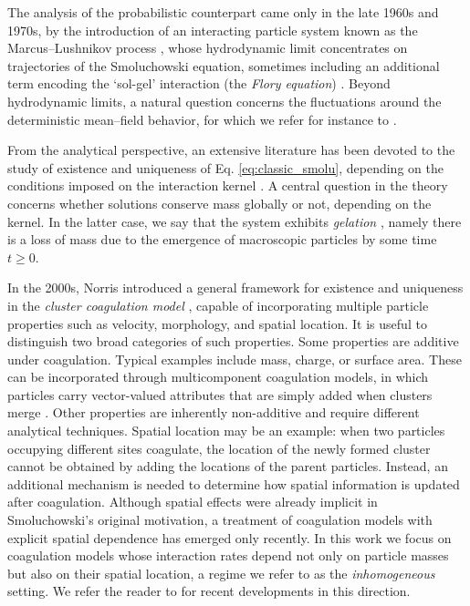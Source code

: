 \documentclass[12pt,twoside]{article}
\begin{document}
The analysis of the probabilistic counterpart came only in the late 1960s and 1970s, by the introduction of an interacting particle system known as the Marcus--Lushnikov process \cite{Lushnikov78,Marcus68,aldous99}, whose hydrodynamic limit concentrates on trajectories of the Smoluchowski equation, sometimes including an additional term encoding the `sol-gel' interaction (the \emph{Flory equation}) \cite{fournier-laurencot-09,fournier-giet-04}. Beyond hydrodynamic limits, a natural question concerns the fluctuations around the deterministic mean--field behavior, for which we refer for instance to \cite{K,AmorimArellanoJara2026}.

From the analytical perspective, an extensive literature has been devoted to the study of existence and uniqueness of Eq. \eqref{eq:classic_smolu}, depending on the conditions imposed on the interaction kernel \cite{mcleod-62-1, white-80, norris-coag-99, fournier-laurencot-06}. 
A central question in the theory concerns whether solutions conserve mass globally or not, depending on the kernel. In the latter case, we say that the system exhibits \emph{gelation} \cite{Fournier25, jeon98, rezakhanlou2013, escobedo-et-al-mass-cons}, namely there is a loss of mass due to the emergence of macroscopic particles by some time $t \geq 0$.

 In the 2000s, Norris introduced a general framework for existence and uniqueness in the \emph{cluster coagulation model} \cite{norris-cluster-coag}, capable of incorporating multiple particle properties such as velocity, morphology, and spatial location. It is useful to distinguish two broad categories of such properties.
Some properties are additive under coagulation. Typical examples include mass, charge, or surface area. These can be incorporated through multicomponent coagulation models, in which particles carry vector-valued attributes that are simply added when clusters merge \cite{ferreira2021,heydecker2024,hoogendijk2024,ferreira2025}.
Other properties are inherently non-additive and require different analytical techniques. Spatial location may be an example: when two particles occupying different sites coagulate, the location of the newly formed cluster cannot be obtained by adding the locations of the parent particles. Instead, an additional mechanism is needed to determine how spatial information is updated after coagulation.  
Although spatial effects were already implicit in Smoluchowski’s original motivation, a treatment of coagulation models with explicit spatial dependence has emerged only recently.
In this work we focus on coagulation models whose interaction rates depend not only on particle masses but also on their spatial location, a regime we refer to as the \emph{inhomogeneous} setting. We refer the reader to \cite{AnIyMa24, AnIyMa24_bis, AKLP23, AKLP26} for recent developments in this direction.
\end{document}
